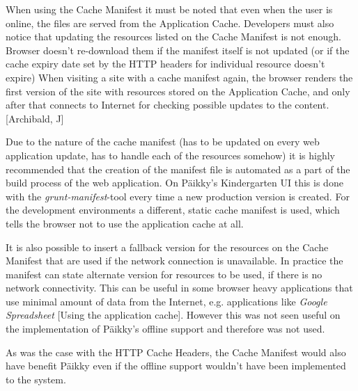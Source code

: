 
When using the Cache Manifest it must be noted that even when the user is online, the files are served from the Application Cache. Developers must also notice that updating the resources listed on the Cache Manifest is not enough. Browser doesn't re-download them if the manifest itself is not updated (or if the cache expiry date set by the HTTP headers for individual resource doesn't expire) When visiting a site with a cache manifest again, the browser renders the first version of the site with resources stored on the Application Cache, and only after that connects to Internet for checking possible updates to the content. [Archibald, J]

Due to the nature of the cache manifest (has to be updated on every web application update, has to handle each of the resources somehow) it is highly recommended that the creation of the manifest file is automated as a part of the build process of the web application. On Päikky's Kindergarten UI this is done with the \textit{grunt-manifest}-tool every time a new production version is created. For the development environments a different, static cache manifest is used, which tells the browser not to use the application cache at all.

It is also possible to insert a fallback version for the resources on the Cache Manifest that are used if the network connection is unavailable. In practice the manifest can state alternate version for resources to be used, if there is no network connectivity. This can be useful in some browser heavy applications that use minimal amount of data from the Internet, e.g. applications like \textit{Google Spreadsheet} [Using the application cache]. However this was not seen useful on the implementation of Päikky's offline support and therefore was not used. %


As was the case with the HTTP Cache Headers, the Cache Manifest would also have benefit Päikky even if the offline support wouldn't have been implemented to the system.

